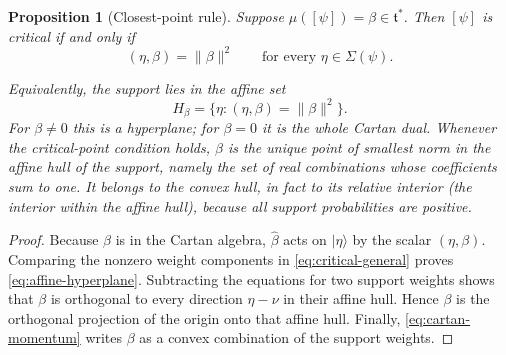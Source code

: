 \documentclass{article}
\newtheorem{proposition}[theorem]{Proposition}
\theoremstyle{definition}
\theoremstyle{remark}
\newcommand{\ket}[1]{\lvert #1\rangle}
\newcommand{\norm}[1]{\lVert #1\rVert}
\begin{document}
\medskip

\begin{proposition}[Closest-point rule]
\label{prop:closest-point}
Suppose $\mu([\psi])=\beta\in\mathfrak t^*$. Then $[\psi]$ is critical
if and only if
\begin{equation}
 (\eta,\beta)=\norm\beta^2
 \qquad\text{for every }\eta\in\Sigma(\psi).
\label{eq:affine-hyperplane}
\end{equation}
\par\noindent
Equivalently, the support lies in the affine set
\begin{equation*}
 H_\beta=\{\eta:(\eta,\beta)=\norm\beta^2\}.
\end{equation*}
For $\beta\ne0$ this is a hyperplane; for $\beta=0$ it is
the whole Cartan dual.
Whenever the critical-point condition holds, $\beta$ is the unique
point of smallest norm in the affine
hull of the support, namely the set of real combinations whose
coefficients sum to one. It belongs to the convex hull, in fact to its
relative interior (the interior within the affine hull), because all
support probabilities are positive.
\end{proposition}

\begin{proof}
Because $\beta$ is in the Cartan algebra, $\widehat\beta$ acts on
$\ket\eta$ by the scalar $(\eta,\beta)$.  Comparing the nonzero weight
components in \eqref{eq:critical-general} proves
\eqref{eq:affine-hyperplane}.  Subtracting the equations for two support
weights shows that $\beta$ is orthogonal to every direction
$\eta-\nu$ in their affine hull.  Hence $\beta$ is the orthogonal
projection of the origin onto that affine hull.  Finally,
\eqref{eq:cartan-momentum} writes $\beta$ as a convex combination of the
support weights.
\end{proof}

\medskip
\end{document}
